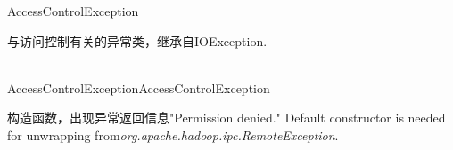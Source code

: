\begin{XeClass}{AccessControlException}
   
 与访问控制有关的异常类，继承自IOException.

  \begin{XeMethod}{\XePublic\\ }{AccessControlException}{AccessControlException}
       
 构造函数，出现异常返回信息"Permission denied."
 Default constructor is needed for unwrapping from\emph{org.apache.hadoop.ipc.RemoteException}.

  \end{XeMethod}

\end{XeClass}
